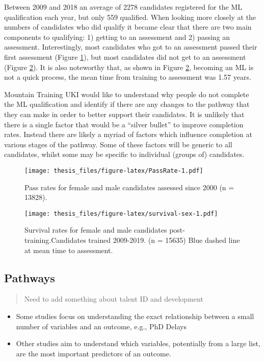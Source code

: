 \documentclass[a4paper,]{book}
\providecommand{\tightlist}{%
  \setlength{\itemsep}{0pt}\setlength{\parskip}{0pt}}
\begin{document}
Between 2009 and 2018 an average of 2278 candidates registered for the ML qualification each year, but only 559 qualified. When looking more closely at the numbers of candidates who did qualify it became clear that there are two main components to qualifying: 1) getting to an assessment and 2) passing an assessment. Interestingly, most candidates who got to an assessment passed their first assessment (Figure \ref{fig:PassRate}), but most candidates did not get to an assessment (Figure \ref{fig:survival-sex}). It is also noteworthy that, as shown in Figure \ref{fig:survival-sex}, becoming an ML is not a quick process, the mean time from training to assessment was 1.57 years.

Mountain Training UKI would like to understand why people do not complete the ML qualification and identify if there are any changes to the pathway that they can make in order to better support their candidates. It is unlikely that there is a single factor that would be a ``silver bullet'' to improve completion rates. Instead there are likely a myriad of factors which influence completion at various stages of the pathway. Some of these factors will be generic to all candidates, whilst some may be specific to individual (groups of) candidates.

\begin{figure}
\centering
\texttt{[image: thesis\_files/figure-latex/PassRate-1.pdf]}
\caption{\label{fig:PassRate}Pass rates for female and male candidates assessed since 2000 (n = 13828).}
\end{figure}

\begin{figure}
\centering
\texttt{[image: thesis\_files/figure-latex/survival-sex-1.pdf]}
\caption{\label{fig:survival-sex}Survival rates for female and male candidates post-training.Candidates trained 2009-2019. (n = 15635)
Blue dashed line at mean time to assessment.}
\end{figure}

\hypertarget{pathways}{%
\subsection{Pathways}\label{pathways}}

\begin{quote}
Need to add something about talent ID and development
\end{quote}

\begin{itemize}
\tightlist
\item
  Some studies focus on understanding the exact relationship between a small number of variables and an outcome, e.g., PhD Delays \citep{VandeSchoot2013a}
\item
  Other studies aim to understand which variables, potentially from a large list, are the most important predictors of an outcome.
\end{itemize}
\end{document}
